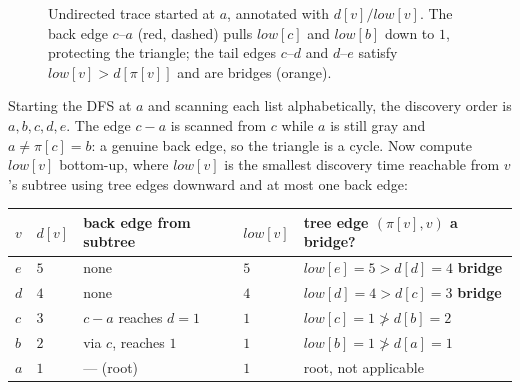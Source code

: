 \begin{figure}[H]
\centering
{}
\caption{Undirected trace started at $a$, annotated with $d[v]/\mathit{low}[v]$. The back edge $c$--$a$ (red, dashed) pulls $\mathit{low}[c]$ and $\mathit{low}[b]$ down to $1$, protecting the triangle; the tail edges $c$--$d$ and $d$--$e$ satisfy $\mathit{low}[v] > d[\pi[v]]$ and are bridges (orange).}
\label{ch03:fig-undir}
\end{figure}

Starting the DFS at $a$ and scanning each list alphabetically, the discovery order is $a,b,c,d,e$. The edge $c-a$ is scanned from $c$ while $a$ is still gray and $a\ne\pi[c]=b$: a genuine back edge, so the triangle is a cycle. Now compute $\mathit{low}[v]$ bottom-up, where $\mathit{low}[v]$ is the smallest discovery time reachable from $v$'s subtree using tree edges downward and at most one back edge:

\begin{center}
\begin{tabular}{@{}lllll@{}}
\toprule
$v$ & $d[v]$ & back edge from subtree & $\mathit{low}[v]$ & tree edge $(\pi[v],v)$ a bridge? \\
\midrule
$e$ & $5$ & none & $5$ & $\mathit{low}[e]=5>d[d]=4$ \;\textbf{bridge} \\
$d$ & $4$ & none & $4$ & $\mathit{low}[d]=4>d[c]=3$ \;\textbf{bridge} \\
$c$ & $3$ & $c{-}a$ reaches $d{=}1$ & $1$ & $\mathit{low}[c]=1\not>d[b]=2$ \\
$b$ & $2$ & via $c$, reaches $1$ & $1$ & $\mathit{low}[b]=1\not>d[a]=1$ \\
$a$ & $1$ & --- (root) & $1$ & root, not applicable \\
\bottomrule
\end{tabular}
\end{center}


